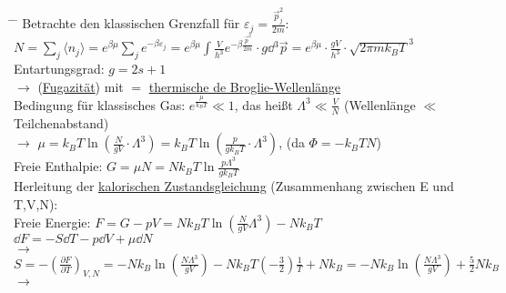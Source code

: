 \begin{tabbing}
\hspace{4em} \= \hspace{4em} \= \kill
Betrachte den klassischen Grenzfall für $\varepsilon_j = \frac{\vec{p}_j^2}{2 m}$:\\
$N = \sum\limits_j \langle n_j \rangle = e^{\beta\mu}\sum\limits_j e^{-\beta\varepsilon_j} = e^{\beta\mu}\int\limits\frac{V}{h^3}e^{-\beta\frac{\vec{p}^2}{2 m}}\cdot g \dd{} ^3 \vec{p} = e^{\beta\mu}\cdot\frac{g V}{h^3}\cdot \sqrt{2 \pi m k_B T}^3$\\
Entartungsgrad: $g = 2 s + 1$\\
$\rightarrow$\>  (\underline{Fugazität}) mit  $=$ \underline{thermische de Broglie-Wellenlänge}\\
Bedingung für klassisches Gas: $e^{\frac{\mu}{k_B T}}\ll 1$, das heißt $\Lambda^3 \ll \frac{V}{N}$ (Wellenlänge $\ll$ Teilchenabstand)\\
$\rightarrow$\> $\mu = k_B T \ln\left(\frac{N}{g V}\cdot\Lambda^3\right) = k_B T \ln\left(\frac{p}{g k_B T}\cdot\Lambda^3\right)$,  (da $\Phi = -k_B T N$)\\
Freie Enthalpie: $G = \mu N = N k_B T \ln \frac{p \Lambda^3}{g k_B T}$\\
Herleitung der \underline{kalorischen Zustandsgleichung} (Zusammenhang zwischen E und T,V,N):\\
Freie Energie: $F = G -p V = N k_B T \ln \left(\frac{N}{g V} \Lambda^3\right) - N k_B T$\\
\> $\dd F = -S \dd T -p \dd V + \mu \dd N$\\
$\rightarrow$\> $S = -\left(\frac{\partial F}{\partial T}\right)_{V,N} = - N k_B \ln\left(\frac{N \Lambda^3}{g V}\right) - N k_B T \left(-\frac{3}{2}\right)\frac{1}{T} + N k_B = - N k_B \ln\left(\frac{N \Lambda^3}{g V}\right) + \frac{5}{2} N k_B$\\
$\rightarrow$\> 
\end{tabbing}


